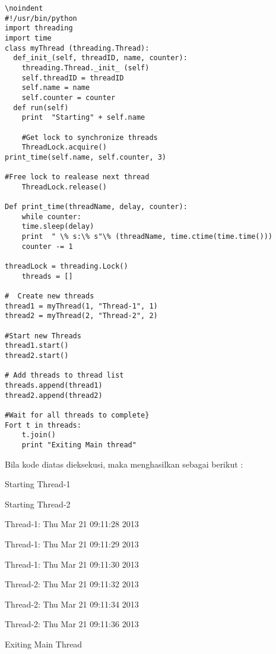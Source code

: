 \documentclass [12pt,a4paper,notitlepage,oneside,bahasa]{article}
\begin{document}
\begin{verbatim}
\noindent 
#!/usr/bin/python
import threading
import time
class myThread (threading.Thread):
  def_init_(self, threadID, name, counter):
	threading.Thread._init_ (self)
	self.threadID = threadID
	self.name = name
	self.counter = counter
  def run(self)
 	print  "Starting" + self.name

 	#Get lock to synchronize threads
	ThreadLock.acquire()
print_time(self.name, self.counter, 3)

#Free lock to realease next thread
	ThreadLock.release()
 
Def print_time(threadName, delay, counter):
	while counter:
	time.sleep(delay)
	print  " \% s:\% s"\% (threadName, time.ctime(time.time()))
	counter -= 1
	
threadLock = threading.Lock()
	threads = []

#  Create new threads
thread1 = myThread(1, "Thread-1", 1)
thread2 = myThread(2, "Thread-2", 2)

#Start new Threads
thread1.start()
thread2.start()

# Add threads to thread list
threads.append(thread1)
thread2.append(thread2)

#Wait for all threads to complete}
Fort t in threads:
	t.join()
	print "Exiting Main thread"
\end{verbatim}

Bila kode diatas dieksekusi, maka menghasilkan sebagai berikut : \par
\vspace{10pt}
\noindent 
{\fontsize{10pt}{10pt}\selectfont Starting Thread-1} \par
\noindent 
{\fontsize{10pt}{10pt}\selectfont Starting Thread-2} \par
\noindent 
{\fontsize{10pt}{10pt}\selectfont Thread-1: Thu Mar 21 09:11:28 2013} \par
\noindent 
{\fontsize{10pt}{10pt}\selectfont Thread-1: Thu Mar 21 09:11:29 2013} \par
\noindent 
{\fontsize{10pt}{10pt}\selectfont Thread-1: Thu Mar 21 09:11:30 2013} \par
\noindent 
{\fontsize{10pt}{10pt}\selectfont Thread-2: Thu Mar 21 09:11:32 2013} \par
\noindent 
{\fontsize{10pt}{10pt}\selectfont Thread-2: Thu Mar 21 09:11:34 2013} \par
\noindent 
{\fontsize{10pt}{10pt}\selectfont Thread-2: Thu Mar 21 09:11:36 2013} \par
\noindent 
{\fontsize{10pt}{10pt}\selectfont Exiting Main Thread} \par
\vspace{12pt}
\end{document}
